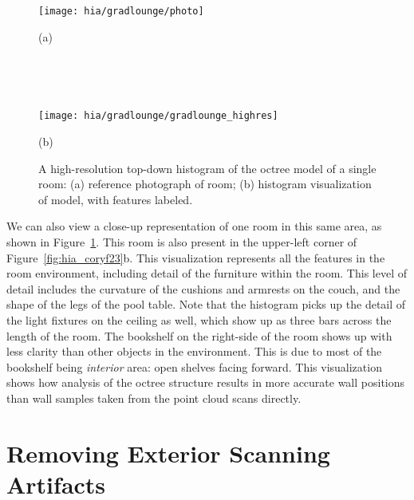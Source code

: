 \documentclass[12pt,onecolumn,oneside]{book}
\begin{document}
\begin{figure}[p]

	\centering
	\begin{minipage}[t]{0.6\linewidth}
		\centerline{\texttt{[image: hia/gradlounge/photo]}}
		\centerline{(a)}
	\end{minipage}
	
	\,
	
	\,
	
	\begin{minipage}[t]{0.6\linewidth}
		\centerline{\texttt{[image: hia/gradlounge/gradlounge\_highres]}}
		\centerline{(b)}
	\end{minipage}

	\caption[Top-down histogram of single room.]{A high-resolution top-down histogram of the octree model of a single room:  (a) reference photograph of room; (b) histogram visualization of model, with features labeled.}
	\label{fig:hia_gradlounge}
\end{figure}

We can also view a close-up representation of one room in this same area, as shown in Figure~\ref{fig:hia_gradlounge}.  This room is also present in the upper-left corner of Figure~\ref{fig:hia_coryf23}b.  This visualization represents all the features in the room environment, including detail of the furniture within the room.  This level of detail includes the curvature of the cushions and armrests on the couch, and the shape of the legs of the pool table.  Note that the histogram picks up the detail of the light fixtures on the ceiling as well, which show up as three bars across the length of the room.  The bookshelf on the right-side of the room shows up with less clarity than other objects in the environment.  This is due to most of the bookshelf being {\it interior} area: open shelves facing forward.  This visualization shows how analysis of the octree structure results in more accurate wall positions than wall samples taken from the point cloud scans directly.

\FloatBarrier
\section{Removing Exterior Scanning Artifacts}
\label{sec:explosion_removal}
\end{document}
